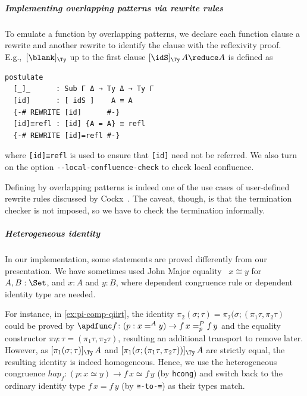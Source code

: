 \documentclass[a4paper,UKenglish,numberwithinsect,cleveref,thm-restate]{lipics-v2021}
\newcommand{\LT}[2][]{\todo[inline,author={L-T},caption={},color={pink},#1]{#2}}
\begin{document}
\subparagraph*{Implementing overlapping patterns via rewrite rules}
To emulate a function by overlapping patterns, we declare each function clause a rewrite and another rewrite to identify the clause with the reflexivity proof.
E.g.,\ $[\blank]_{\Ty}$ up to the first clause $[\idS]_{\Ty}\,A \reduce A$ is defined as
\begin{lstlisting}
postulate
  [_]_      : Sub Γ Δ → Ty Δ → Ty Γ
  [id]      : [ idS ]    A ≡ A
  {-# REWRITE [id]      #-}
  [id]≡refl : [id] {A = A} ≡ refl
  {-# REWRITE [id]=refl #-}
\end{lstlisting}
where \lstinline|[id]≡refl| is used to ensure that \lstinline|[id]| need not be referred.
We also turn on the option \texttt{-{}-local-confluence-check} to check local confluence.


Defining by overlapping patterns is indeed one of the use cases of user-defined rewrite rules discussed by Cockx~\cite{Cockx2020}. 
The caveat, though, is that the termination checker is not imposed, so we have to check the termination informally.

\subparagraph*{Heterogeneous identity}
In our implementation, some statements are proved differently from our presentation. 
We have sometimes used John Major equality~\cite{McBride1999} $x \cong y$  for $A, B : \Set$, and $x : A$ and $y : B$, where dependent congruence rule or dependent identity type are needed.

For instance, in \cref{ex:pi-comp-qiirt}, the identity $\pi_2(\sigma ; \tau) = \pi_2(\sigma; (\pi_1 \tau, \pi_2 \tau)$ could be proved by $\apdfunc f \colon (p : x =^A y) \to f\,x =^{P}_{p} f\,y$ and the equality constructor $\pi\eta : \tau = (\pi_1\tau, \pi_2\tau)$, resulting an additional transport to remove later.
However, as $[\pi_1(\sigma; \tau)]_{\Ty}\,A$ and $[\pi_1(\sigma; (\pi_1\tau, \pi_2\tau))]_{\Ty}\,A$ are strictly equal, the resulting identity is indeed homogeneous.
Hence, we use the heterogeneous congruence $\mathit{hap}_f\colon (p : x \simeq y) \to f\,x\simeq f\,y$ (by \lstinline|hcong|) and switch back to the ordinary identity type $f\,x = f\, y$ (by \lstinline|≅-to-≡|) as their types match.
 

\LT[noinline]{Mention the NbE for SC here?}
\end{document}
